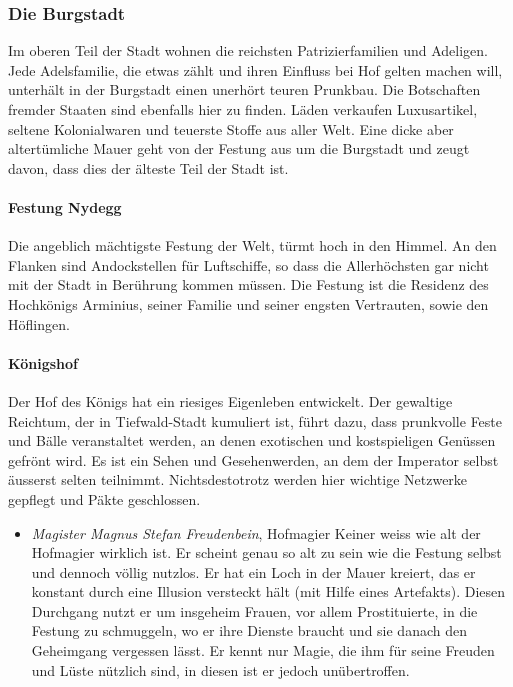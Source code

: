 \documentclass[12pt,twoside,twocolumn,openany]{book}
\begin{document}
\subsubsection{Die Burgstadt}
Im oberen Teil der Stadt wohnen die reichsten Patrizierfamilien und Adeligen. Jede Adelsfamilie, die etwas zählt und ihren Einfluss bei Hof gelten machen will, unterhält in der Burgstadt einen unerhört teuren Prunkbau. Die Botschaften fremder Staaten sind ebenfalls hier zu finden. Läden verkaufen Luxusartikel, seltene Kolonialwaren und teuerste Stoffe aus aller Welt. Eine dicke aber altertümliche Mauer geht von der Festung aus um die Burgstadt und zeugt davon, dass dies der älteste Teil der Stadt ist.

\paragraph{Festung Nydegg} Die angeblich mächtigste Festung der Welt, türmt hoch in den Himmel. An den Flanken sind Andockstellen für Luftschiffe, so dass die Allerhöchsten gar nicht mit der Stadt in Berührung kommen müssen. Die Festung ist die Residenz des Hochkönigs Arminius, seiner Familie und seiner engsten Vertrauten, sowie den Höflingen.

\paragraph{Königshof} Der Hof des Königs hat ein riesiges Eigenleben entwickelt. Der gewaltige Reichtum, der in Tiefwald-Stadt kumuliert ist, führt dazu, dass prunkvolle Feste und Bälle veranstaltet werden, an denen exotischen und kostspieligen Genüssen gefrönt wird. Es ist ein Sehen und Gesehenwerden, an dem der Imperator selbst äusserst selten teilnimmt. Nichtsdestotrotz werden hier wichtige Netzwerke gepflegt und Päkte geschlossen.
\begin{itemize}
	\item\textit{Magister Magnus Stefan Freudenbein}, Hofmagier
	Keiner weiss wie alt der Hofmagier wirklich ist. Er scheint genau so alt zu sein wie die Festung selbst und dennoch völlig nutzlos. Er hat ein Loch in der Mauer kreiert, das er konstant durch eine Illusion versteckt hält (mit Hilfe eines Artefakts). Diesen Durchgang nutzt er um insgeheim Frauen, vor allem Prostituierte, in die Festung zu schmuggeln, wo er ihre Dienste braucht und sie danach den Geheimgang vergessen lässt. Er kennt nur Magie, die ihm für seine Freuden und Lüste nützlich sind, in diesen ist er jedoch unübertroffen.
\end{itemize}
\end{document}
